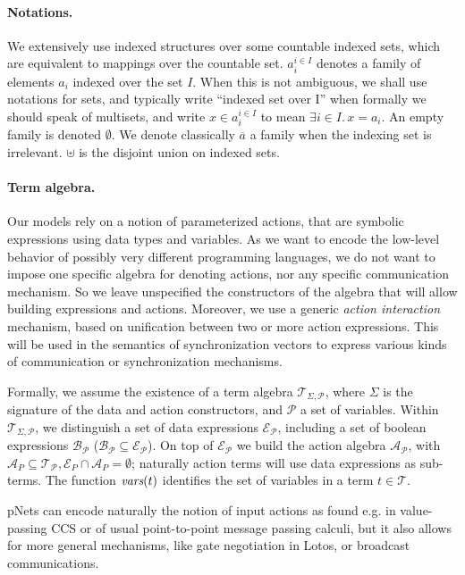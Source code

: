 \documentclass{lncs/llncs}
\def\AlgT{\mathcal{T}}
\renewcommand{\P}{\mathcal P}
\begin{document}
\paragraph*{Notations.}
We extensively use indexed structures
over some countable indexed sets, which are equivalent to mappings over
the countable set. %
$a_i^{i\in I}$
denotes a family of elements $a_i$ indexed over the
set $I$.
When this is not
ambiguous, we shall use notations for sets, and typically write
``indexed set over I'' when formally we should speak of multisets, and
write $x\in a_i^{i\in I}$ to mean $\exists i\in I.\, x=a_i$.  An empty
family is denoted $\emptyset$. We
denote classically $\overline{a}$ a family when the indexing set is
irrelevant.  $\uplus$ is the disjoint union on indexed sets.

\paragraph*{Term algebra.}
Our models rely on a notion of parameterized actions, that are
symbolic expressions using data types and variables. As we want to encode
the low-level behavior of possibly very different
programming languages, we do not want to impose one specific algebra
for denoting actions, nor any specific communication mechanism. So we
leave unspecified the constructors of the algebra that will allow building
expressions and actions. Moreover, we use a generic {\em action interaction}
mechanism, based on unification between two or more action
expressions. This will be used in the semantics of synchronization
vectors to express various kinds of communication or synchronization mechanisms.

\def\Talg{\mathcal{T}_{\Sigma,\P}}
Formally, we assume the existence of a term algebra $\Talg$,
where $\Sigma$ is the signature of the data and action constructors,
and $\P$ a set of variables. Within $\Talg$, we distinguish a set of
data expressions $\mathcal{E}_\P$, including a set of boolean
expressions $\mathcal{B}_{\P}$ ($\mathcal{B}_{\P}\subseteq\mathcal{E}_\P$).
On top of $\mathcal{E}_\P$ we build the action algebra
$\mathcal{A}_\P$, with $\mathcal{A}_P\subseteq\mathcal{T}_\P,
\mathcal{E}_P\cap\mathcal{A}_P=\emptyset$;
naturally action terms will use data expressions as sub-terms.
The function $\vars(t)$ identifies the set of variables in a term
$t\in\AlgT$.

pNets can encode naturally the notion of input actions as found e.g. in value-passing CCS
\cite{Milner89} or of usual point-to-point message passing calculi, but it also allows
for more general mechanisms, like gate negotiation in Lotos, or broadcast
communications.
\end{document}
